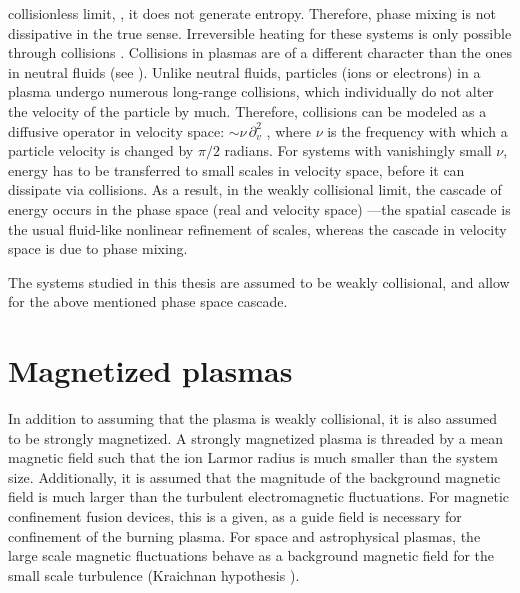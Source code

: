 	collisionless limit, \ie, it does not generate 
	entropy. Therefore, phase mixing is not dissipative in the true sense. Irreversible heating for these systems is only possible through collisions
	\cite{schekochihin08, tome}. Collisions in plasmas are of a different character than
    the ones in neutral fluids (see ). Unlike neutral fluids,
    particles (ions or electrons) in a plasma undergo numerous long-range collisions, which
    individually do not
    alter the velocity of the particle by much. 
	Therefore, collisions can be modeled as a diffusive operator in velocity space: $\sim \nu \,
	\partial_v^2$ \cite{howes06, tome}, where $\nu$ is the frequency with which a particle velocity is changed by
    $\pi/2$ radians. For systems with vanishingly
	small $\nu$, energy has to be transferred to small scales in velocity space, before it
    can dissipate via collisions. As a result, in the weakly collisional limit, the cascade of energy
    occurs in the phase space (real and velocity space) \cite{schekochihin08, tome,
    tatsuno09}---the spatial cascade is the usual fluid-like nonlinear refinement of
    scales, whereas the cascade in velocity space is due to phase mixing.
    
    The systems studied in this thesis are assumed to be weakly collisional, and allow for 
    the above mentioned phase space cascade. 

\section{Magnetized plasmas}

    In addition to assuming that the plasma is weakly collisional, it
    is also assumed to be strongly magnetized. A strongly magnetized plasma is threaded by
    a mean magnetic field such that the ion Larmor radius is much smaller than the system
    size. Additionally, it is assumed that
    the magnitude of the background magnetic field is much larger than the turbulent electromagnetic fluctuations. For
    magnetic confinement fusion devices, this is a given, as a guide field is necessary for
    confinement of the burning plasma. For space and astrophysical plasmas, the large scale
    magnetic fluctuations behave as a background magnetic field for the small scale
    turbulence (Kraichnan hypothesis \cite{kraichnan65}). 

